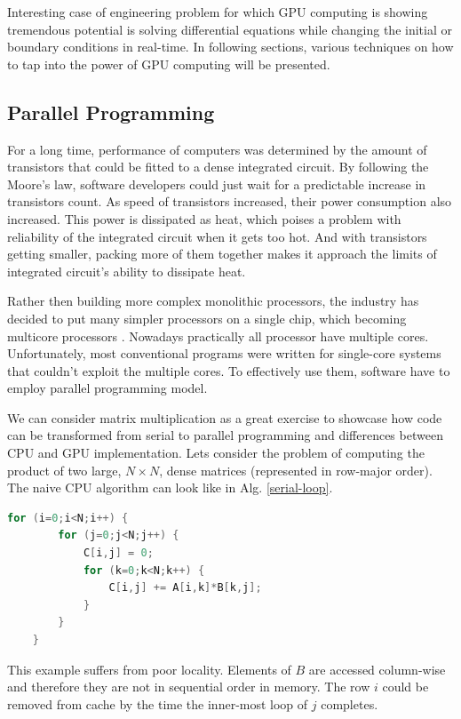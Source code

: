Interesting case of engineering problem for which GPU computing is showing tremendous potential is solving differential equations while changing the initial or boundary conditions in real-time. In following sections, various techniques on how to tap into the power of GPU computing will be presented.

\subsection{Parallel Programming}
For a long time, performance of computers was determined by the amount of transistors that could be fitted to a dense integrated circuit. By following the Moore's law, software developers could just wait for a predictable increase in transistors count. As speed of transistors increased, their power consumption also increased. This power is dissipated as heat, which poises a problem with reliability of the integrated circuit when it gets too hot. And with transistors getting smaller, packing more of them together makes it approach the limits of integrated circuit's ability to dissipate heat.

Rather then building more complex monolithic processors, the industry has decided to put many simpler processors on a single chip, which becoming multicore processors \citep{PACHECO20111}. Nowadays practically all processor have multiple cores. Unfortunately, most conventional programs were written for single-core systems that couldn't exploit the multiple cores. To effectively use them, software have to employ parallel programming model.

We can consider matrix multiplication as a great exercise to showcase how code can be transformed from serial to parallel programming and differences between CPU and GPU implementation. Lets consider the problem of computing the product of two large, $N \times N$, dense matrices (represented in row-major order). The naive CPU algorithm can look like in Alg. \ref{serial-loop}.

\begin{lstlisting}[language=Cpp, caption=Pseudocode with serial loop., label=serial-loop]
	for (i=0;i<N;i++) {
		for (j=0;j<N;j++) {
			C[i,j] = 0;
			for (k=0;k<N;k++) {
				C[i,j] += A[i,k]*B[k,j];
			}
		}
	}
\end{lstlisting}

This example suffers from poor locality. Elements of $B$ are accessed column-wise and therefore they are not in sequential order in memory. The row $i$ could be removed from cache by the time the inner-most loop of $j$ completes. 

